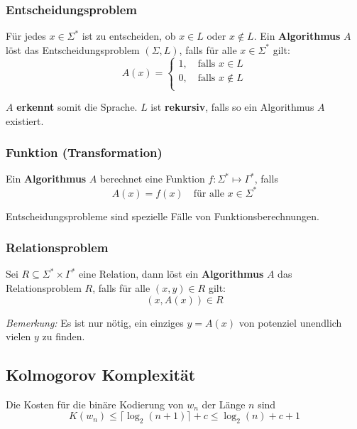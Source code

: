 \documentclass[11pt]{article}
\begin{document}
\subsubsection{Entscheidungsproblem}
F{\"u}r jedes $x \in \Sigma^*$ ist zu entscheiden, ob $x \in L$ oder $x \notin L$. Ein \textbf{Algorithmus} $A$ löst das Entscheidungsproblem $(\Sigma, L)$, falls f{\"u}r alle $x \in \Sigma^*$ gilt:
\begin{equation*}
	A(x) = \begin{cases}
		1, \quad\text{falls $x \in L$} \\
		0, \quad\text{falls $x \notin L$} \\
	\end{cases}
\end{equation*}

$A$ \textbf{erkennt} somit die Sprache. $L$ ist \textbf{rekursiv}, falls so ein Algorithmus $A$ existiert.

\subsubsection{Funktion (Transformation)}
Ein \textbf{Algorithmus} $A$ berechnet eine Funktion $f: \Sigma^* \mapsto \Gamma^*$, falls
\begin{equation*}
	A(x) = f(x) \quad\text{f{\"u}r alle $x \in \Sigma^*$}
\end{equation*}

Entscheidungsprobleme sind spezielle F{\"a}lle von Funktionsberechnungen.

\subsubsection{Relationsproblem}
Sei $R \subseteq \Sigma^*\times\Gamma^*$ eine Relation, dann löst ein \textbf{Algorithmus} $A$ das Relationsproblem $R$, falls f{\"u}r alle $(x,y) \in R$ gilt:
\begin{equation*}
	(x, A(x)) \in R
\end{equation*}

\emph{Bemerkung:} Es ist nur nötig, ein einziges $y = A(x)$ von potenziel unendlich vielen $y$ zu finden.

\subsection{Kolmogorov Komplexit{\"a}t}

Die Kosten f{\"u}r die bin{\"a}re Kodierung von $w_n$ der L{\"a}nge $n$ sind
\begin{equation*}
	K(w_n) \leq \lceil\log_2(n+1)\rceil + c \leq \log_2(n) + c + 1
\end{equation*}
\end{document}
